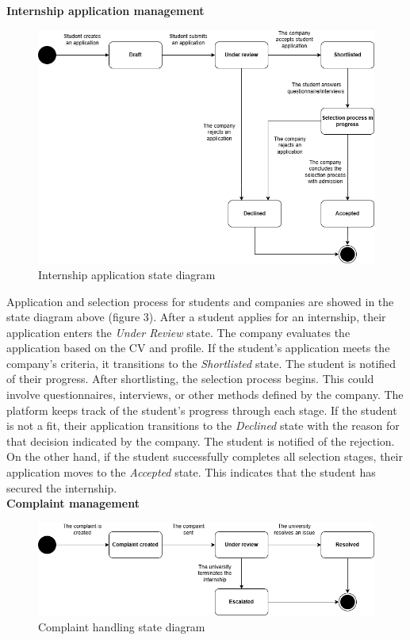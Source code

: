 \textbf{Internship application management}\\
\begin{figure}[H]
	\includegraphics[width=\textwidth,height=\textheight,keepaspectratio]{RASD-Latex/assets/state_diagram_2.png}
	\caption{Internship application state diagram}
	\label{fig:DataRequest}
\end{figure}

Application and selection process for students and companies are showed in the state diagram above (figure 3). After a student applies for an internship, their application enters the \textit{Under Review} state. The company evaluates the application based on the CV and profile. If the student’s application meets the company’s criteria, it transitions to the \textit{Shortlisted} state. The student is notified of their progress. After shortlisting, the selection process begins. This could involve questionnaires, interviews, or other methods defined by the company. The platform keeps track of the student's progress through each stage. If the student is not a fit, their application transitions to the \textit{Declined} state with the reason for that decision indicated by the company. The student is notified of the rejection. On the other hand, if the student successfully completes all selection stages, their application moves to the \textit{Accepted} state. This indicates that the student has secured the internship. \\

\textbf{Complaint management}\\
\begin{figure}[H]
	\includegraphics[width=\textwidth,height=\textheight,keepaspectratio]{RASD-Latex/assets/state_diagram_3.png}
	\caption{Complaint handling state diagram}
	\label{fig:DataRequest}
\end{figure}

